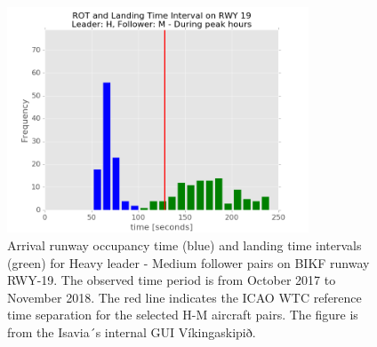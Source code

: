 \begin{figure}[h]
    \centering
    \includegraphics[width=0.8\textwidth]{graphics/fig_rot_landig_time_interval_RWY19_leader_H_follower_M_peak-hour_BAR_20171004_20181130.png}
    \caption[Caption table]{Arrival runway occupancy time (blue) and landing time intervals (green) for Heavy leader - Medium follower pairs on BIKF runway RWY-19. The observed time period is from October 2017 to November 2018. The red line indicates the ICAO WTC reference time separation for the selected H-M aircraft pairs. The figure is from the Isavia´s internal GUI Víkingaskipið.}\label{fig:AROT_LTI_rwy19_H_M}
\end{figure}




